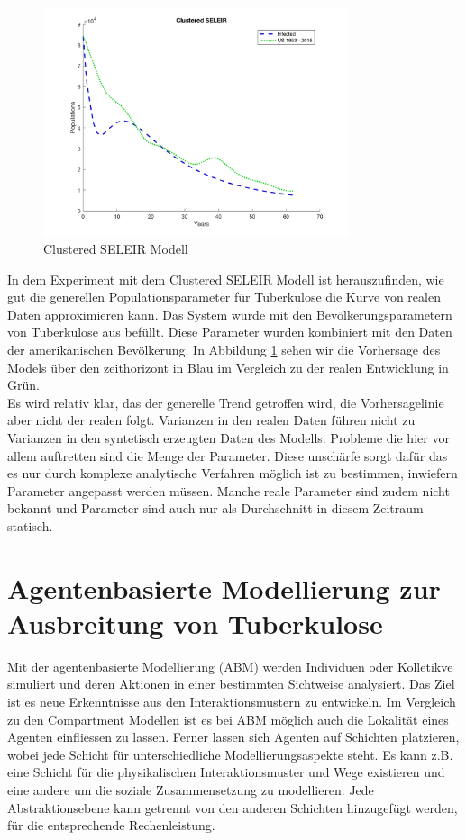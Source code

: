 \documentclass[paper=a4, fontsize=11pt, ngerman, abstract=on]{scrartcl}
\numberwithin{equation}{section} %
\numberwithin{figure}{section} %
\numberwithin{table}{section} %
\begin{document}
\begin{figure}[ht]
  \centering
  \includegraphics[width=0.8\textwidth,keepaspectratio]{images/clustered_seleir_against_us_data}
  \caption{Clustered SELEIR Modell}
  \label{fig:clustered-seleir-compare}
\end{figure}

In dem Experiment mit dem Clustered SELEIR Modell ist herauszufinden, wie gut die generellen Populationsparameter für Tuberkulose die Kurve von realen Daten approximieren kann. Das System wurde mit den Bevölkerungsparametern von Tuberkulose aus \cite{Trauer2014} befüllt. Diese Parameter wurden kombiniert mit den Daten der amerikanischen Bevölkerung. In Abbildung \ref{fig:clustered-seleir-compare} sehen wir die Vorhersage des Models über den zeithorizont in Blau im Vergleich zu der realen Entwicklung in Grün. \\

Es wird relativ klar, das der generelle Trend getroffen wird, die Vorhersagelinie aber nicht der realen folgt. Varianzen in den realen Daten führen nicht zu Varianzen in den syntetisch erzeugten Daten des Modells. Probleme die hier vor allem auftretten sind die Menge der Parameter. Diese unschärfe sorgt dafür das es nur durch komplexe analytische Verfahren möglich ist zu bestimmen, inwiefern Parameter angepasst werden müssen. Manche reale Parameter sind zudem nicht bekannt und Parameter sind auch nur als Durchschnitt in diesem Zeitraum statisch.

\section{Agentenbasierte Modellierung zur Ausbreitung von Tuberkulose}

Mit der agentenbasierte Modellierung (ABM) werden Individuen oder Kolletikve simuliert und deren Aktionen in einer bestimmten Sichtweise analysiert. Das Ziel ist es neue Erkenntnisse aus den Interaktionsmustern zu entwickeln. Im Vergleich zu den Compartment Modellen ist es bei ABM möglich auch die Lokalität eines Agenten einfliessen zu lassen. Ferner lassen sich Agenten auf Schichten platzieren, wobei jede Schicht für unterschiedliche Modellierungsaspekte steht. Es kann z.B. eine Schicht für die physikalischen Interaktionsmuster und Wege existieren und eine andere um die soziale Zusammensetzung zu modellieren. Jede Abstraktionsebene kann getrennt von den anderen Schichten hinzugefügt werden, für die entsprechende Rechenleistung. \\
\end{document}
